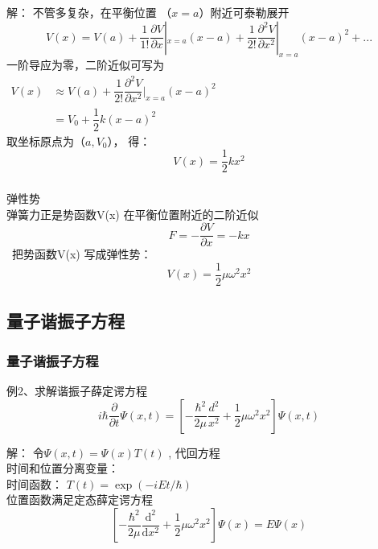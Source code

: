 \begin{frame}
	\frametitle{}
	\alert{解：} 	不管多复杂，在平衡位置 （$x=a$）附近可泰勒展开
	\begin{equation*}
		V(x)=V(a) +\frac{1}{1!} \frac{\partial V}{\partial x} |_{x=a} (x-a) +\frac{1}{2!} \frac{\partial ^2 V}{\partial x ^2} |_{x=a} (x-a) ^2 + ... 
	\end{equation*}
	一阶导应为零，二阶近似可写为 \\
	$\displaystyle  \begin{array}{lllllllll}
		V(x) &\approx V(a)+\dfrac{1}{2!} \dfrac{\partial ^2 V}{\partial x ^2} |_{x=a} (x-a) ^2   \\
		& =V_0+\dfrac{1}{2} k (x-a) ^2 
	\end{array}$\\
	取坐标原点为（$a, V_0 $）， 得：\\
	\begin{equation*}
		V(x)=\dfrac{1}{2} k x^2 
	\end{equation*}	
\end{frame}

\begin{frame}
	\frametitle{}
	\begin{block}{弹性势}
		~~\\
		弹簧力正是势函数V(x) 在平衡位置附近的二阶近似\\
		\begin{equation*}
			F=-\frac{ \partial V}{\partial x}=-kx 
		\end{equation*}	
		 把势函数V(x) 写成弹性势：\\
		\begin{equation*}
			V(x)=\dfrac{1}{2} \mu \omega ^2 x^2 
		\end{equation*}
	\end{block}	
\end{frame}	

\subsection{量子谐振子方程}

\begin{frame}
	\frametitle{量子谐振子方程}
	\begin{exampleblock} {例2、求解谐振子薛定谔方程}
	\begin{equation*}
		i\hbar \frac{\partial }{\partial t} \Psi (x,t ) =[ -\frac{\hbar^2}{2\mu } \frac{d ^2}{x^2} + \frac{1}{2} \mu \omega ^2 x^2   ] \Psi (x, t ) 
	\end{equation*}
	\end{exampleblock}
	\alert{解：} 	令$\Psi (x,t) =\Psi(x) T(t) $ ,  代回方程\\
	时间和位置分离变量：\\
	时间函数： $T(t)  = \exp(-i E t /\hbar) $ \\
	位置函数满足定态薛定谔方程\\
	\begin{equation*}
		\left [ -\frac{\hbar^2}{2\mu} \frac{\mathrm{d} ^2}{\mathrm{d} x^2} +\frac{1}{2}\mu \omega^2 x^2  \right ]\Psi(x)=E\Psi(x) 
	\end{equation*}	
\end{frame}

